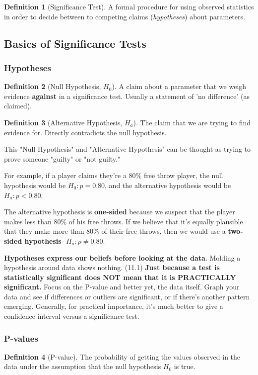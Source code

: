 \documentclass[12pt, a4paper]{article}
\theoremstyle{definition}
\newtheorem{definition}{Definition}
\begin{document}
\begin{definition}[Significance Test]
    A formal procedure for using observed statistics in order to decide between to competing claims (\textit{hypotheses}) about parameters.
\end{definition}

\subsection{Basics of Significance Tests}
\subsubsection{Hypotheses}
\begin{definition}[Null Hypothesis, $H_0$]
    A claim about a parameter that we weigh evidence \textbf{against} in a significance test. Usually a statement of 'no difference' (as claimed).
\end{definition}

\begin{definition}[Alternative Hypothesis, $H_a$]
    The claim that we are trying to find evidence for. Directly contradicts the null hypothesis.
\end{definition}

This "Null Hypothesis" and "Alternative Hypothesis" can be thought as trying to prove someone "guilty" or "not guilty."

For example, if a player claims they're a 80\% free throw player, the null hypothesis would be $H_0: p = 0.80$, and the alternative hypothesis would be $H_a: p < 0.80$.

The alternative hypothesis is \textbf{one-sided} because we suspect that the player makes less than 80\% of his free throws. If we believe that it's equally plausible that they make more than 80\% of their free throws, then we would use a \textbf{two-sided hypothesis}- $H_a: p \neq 0.80$.

\textbf{Hypotheses express our beliefs before looking at the data}. Molding a hypothesis around data shows nothing.
(11.1) \textbf{Just because a test is statistically significant does NOT mean that it is PRACTICALLY significant.}
Focus on the P-value and better yet, the data itself.
Graph your data and see if differences or outliers are significant, or if there's another pattern emerging.
Generally, for practical importance, it's much better to give a confidence interval versus a significance test.

\subsubsection{P-values}
\begin{definition}[P-value]
    The probability of getting the values observed in the data under the assumption that the null hypothesis $H_0$ is true.
\end{definition}
\end{document}
